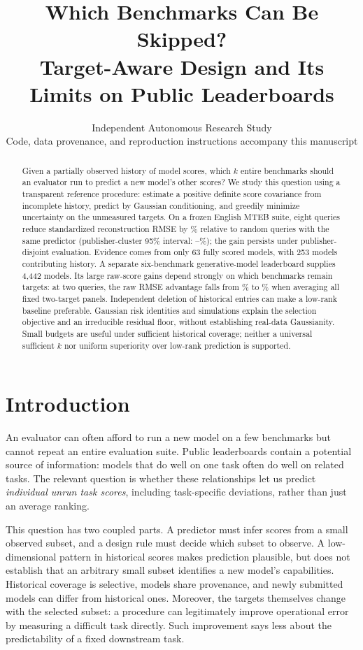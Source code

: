 \documentclass{article}
\title{Which Benchmarks Can Be Skipped?\\Target-Aware Design and Its Limits on Public Leaderboards}
\author{Independent Autonomous Research Study\\Code, data provenance, and reproduction instructions accompany this manuscript}
\begin{document}
\maketitle
\begin{abstract}
Given a partially observed history of model scores, which $k$ entire benchmarks should an evaluator run to predict a new model's other scores? We study this question using a transparent reference procedure: estimate a positive definite score covariance from incomplete history, predict by Gaussian conditioning, and greedily minimize uncertainty on the unmeasured targets. On a frozen English MTEB suite, eight queries reduce standardized reconstruction RMSE by \MGain\% relative to random queries with the same predictor (publisher-cluster 95\% interval: \MGainLo--\MGainHi\%); the gain persists under publisher-disjoint evaluation. Evidence comes from only 63 fully scored models, with 253 models contributing history. A separate six-benchmark generative-model leaderboard supplies 4,442 models. Its large raw-score gains depend strongly on which benchmarks remain targets: at two queries, the raw RMSE advantage falls from \LRawGain\% to \LFixRawGain\% when averaging all fixed two-target panels. Independent deletion of historical entries can make a low-rank baseline preferable. Gaussian risk identities and simulations explain the selection objective and an irreducible residual floor, without establishing real-data Gaussianity. Small budgets are useful under sufficient historical coverage; neither a universal sufficient $k$ nor uniform superiority over low-rank prediction is supported.
\end{abstract}

\section{Introduction}
\label{sec:intro}
An evaluator can often afford to run a new model on a few benchmarks but cannot repeat an entire evaluation suite. Public leaderboards contain a potential source of information: models that do well on one task often do well on related tasks. The relevant question is whether these relationships let us predict \emph{individual unrun task scores}, including task-specific deviations, rather than just an average ranking.

This question has two coupled parts. A predictor must infer scores from a small observed subset, and a design rule must decide which subset to observe. A low-dimensional pattern in historical scores makes prediction plausible, but does not establish that an arbitrary small subset identifies a new model's capabilities. Historical coverage is selective, models share provenance, and newly submitted models can differ from historical ones. Moreover, the targets themselves change with the selected subset: a procedure can legitimately improve operational error by measuring a difficult task directly. Such improvement says less about the predictability of a fixed downstream task.
\end{document}
